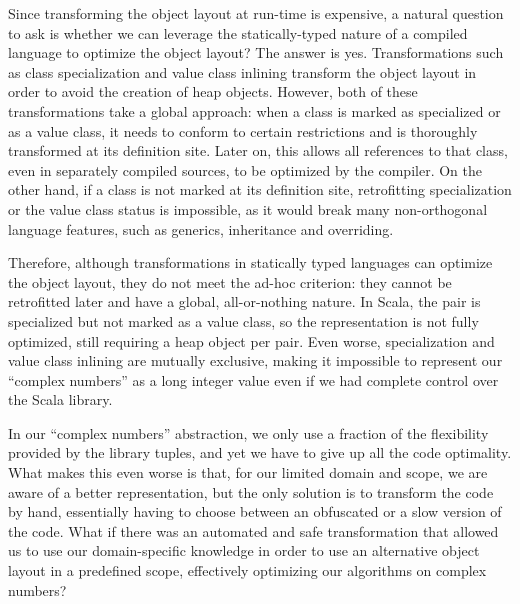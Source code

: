 Since transforming the object layout at run-time is expensive, a natural question to ask is whether we can leverage the statically-typed nature of a compiled language to optimize the object layout? The answer is yes. Transformations such as class specialization and value class inlining transform the object layout in order to avoid the creation of heap objects. However, both of these transformations take a global approach: when a class is marked as specialized or as a value class, it needs to conform to certain restrictions and is thoroughly transformed at its definition site. Later on, this allows all references to that class, even in separately compiled sources, to be optimized by the compiler. On the other hand, if a class is not marked at its definition site, retrofitting specialization or the value class status is impossible, as it would break many non-orthogonal language features, such as generics, inheritance and overriding. %

Therefore, although transformations in statically typed languages can optimize the object layout, they do not meet the ad-hoc criterion: they cannot be retrofitted later and have a global, all-or-nothing nature. In Scala, the pair is specialized but not marked as a value class, so the representation is not fully optimized, still requiring a heap object per pair. Even worse, specialization and value class inlining are mutually exclusive, making it impossible to represent our ``complex numbers'' as a long integer value even if we had complete control over the Scala library.

In our ``complex numbers'' abstraction, we only use a fraction of the flexibility provided by the library tuples, and yet we have to give up all the code optimality. What makes this even worse is that, for our limited domain and scope, we are aware of a better representation, but the only solution is to transform the code by hand, essentially having to choose between an obfuscated or a slow version of the code. What if there was an automated and safe transformation that allowed us to use our domain-specific knowledge in order to use an alternative object layout in a predefined scope, effectively optimizing our algorithms on complex numbers?

